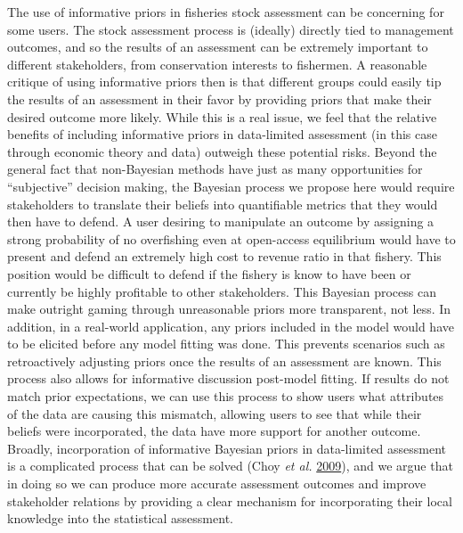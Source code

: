 \documentclass[twoside,12pt,final]{ucthesis-CA2012}
\begin{document}
\begin{ucmainmatter}
The use of informative priors in fisheries stock assessment can be
concerning for some users. The stock assessment process is (ideally)
directly tied to management outcomes, and so the results of an
assessment can be extremely important to different stakeholders, from
conservation interests to fishermen. A reasonable critique of using
informative priors then is that different groups could easily tip the
results of an assessment in their favor by providing priors that make
their desired outcome more likely. While this is a real issue, we feel
that the relative benefits of including informative priors in
data-limited assessment (in this case through economic theory and data)
outweigh these potential risks. Beyond the general fact that
non-Bayesian methods have just as many opportunities for ``subjective''
decision making, the Bayesian process we propose here would require
stakeholders to translate their beliefs into quantifiable metrics that
they would then have to defend. A user desiring to manipulate an outcome
by assigning a strong probability of no overfishing even at open-access
equilibrium would have to present and defend an extremely high cost to
revenue ratio in that fishery. This position would be difficult to
defend if the fishery is know to have been or currently be highly
profitable to other stakeholders. This Bayesian process can make
outright gaming through unreasonable priors more transparent, not less.
In addition, in a real-world application, any priors included in the
model would have to be elicited before any model fitting was done. This
prevents scenarios such as retroactively adjusting priors once the
results of an assessment are known. This process also allows for
informative discussion post-model fitting. If results do not match prior
expectations, we can use this process to show users what attributes of
the data are causing this mismatch, allowing users to see that while
their beliefs were incorporated, the data have more support for another
outcome. Broadly, incorporation of informative Bayesian priors in
data-limited assessment is a complicated process that can be solved
(Choy \emph{et al.} \protect\hyperlink{ref-Choy2009}{2009}), and we
argue that in doing so we can produce more accurate assessment outcomes
and improve stakeholder relations by providing a clear mechanism for
incorporating their local knowledge into the statistical assessment.


\end{ucmainmatter}
\end{document}
